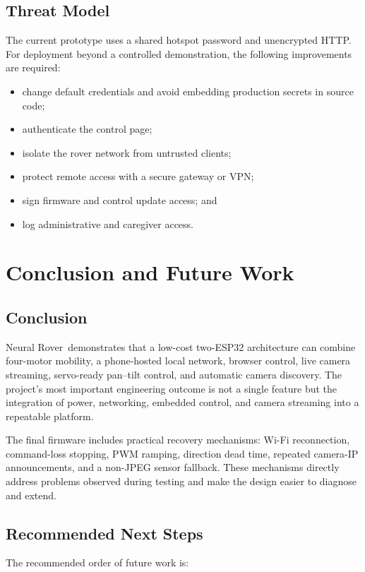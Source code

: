 \documentclass[12pt,a4paper,oneside]{report}
\newcommand{\ProjectTitle}{Neural Rover}
\begin{document}
\section{Threat Model}
The current prototype uses a shared hotspot password and unencrypted HTTP. For
deployment beyond a controlled demonstration, the following improvements are
required:

\begin{itemize}
  \item change default credentials and avoid embedding production secrets in
        source code;
  \item authenticate the control page;
  \item isolate the rover network from untrusted clients;
  \item protect remote access with a secure gateway or VPN;
  \item sign firmware and control update access; and
  \item log administrative and caregiver access.
\end{itemize}

\chapter{Conclusion and Future Work}
\label{ch:conclusion}

\section{Conclusion}
\ProjectTitle\ demonstrates that a low-cost two-ESP32 architecture can combine
four-motor mobility, a phone-hosted local network, browser control, live camera
streaming, servo-ready pan--tilt control, and automatic camera discovery. The
project's most important engineering outcome is not a single feature but the
integration of power, networking, embedded control, and camera streaming into a
repeatable platform.

The final firmware includes practical recovery mechanisms: Wi-Fi reconnection,
command-loss stopping, PWM ramping, direction dead time, repeated camera-IP
announcements, and a non-JPEG sensor fallback. These mechanisms directly address
problems observed during testing and make the design easier to diagnose and
extend.

\section{Recommended Next Steps}
The recommended order of future work is:
\end{document}
